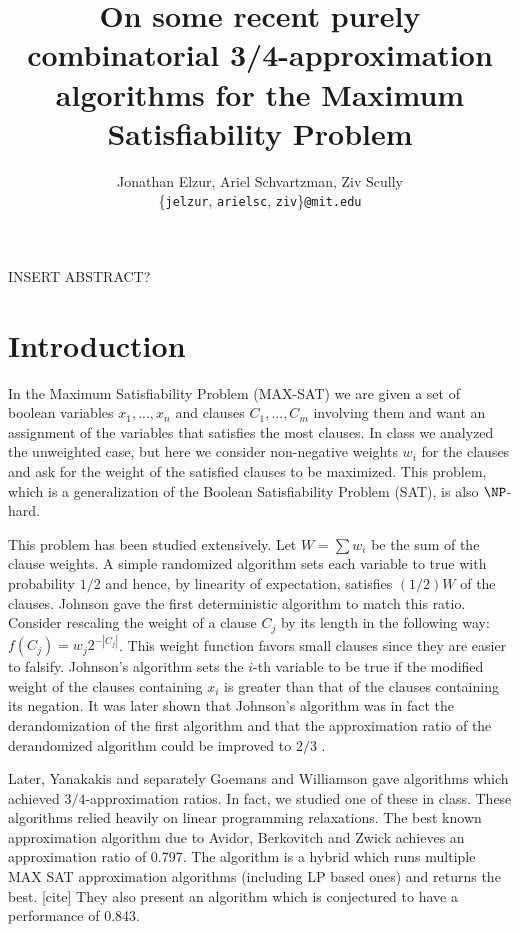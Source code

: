 \documentclass[11pt,letter]{article}
\numberwithin{theorem}{section}
\begin{document}


\title{On some recent purely combinatorial 3/4-approximation algorithms for the Maximum Satisfiability Problem}

\author{Jonathan Elzur, Ariel Schvartzman, Ziv Scully \\
  \{\texttt{jelzur}, \texttt{arielsc}, \texttt{ziv}\}\texttt{@mit.edu}}

\maketitle

INSERT ABSTRACT?

\section{Introduction}

In the Maximum Satisfiability Problem (MAX-SAT) we are given a set of boolean variables $x_1, ..., x_n$
and clauses $C_1,...,C_m$ involving them and want an assignment of the variables that satisfies the most clauses.
In class we analyzed the unweighted case, but here we consider non-negative weights $w_i$ for the clauses
and ask for the weight of the satisfied clauses to be maximized. This problem, which is a generalization of the
Boolean Satisfiability Problem (SAT), is also $\NP$-hard.

This problem has been studied extensively. Let $W = \sum w_i$ be the sum of the clause weights.
A simple randomized algorithm sets each variable to true with probability $1/2$ and hence,
by linearity of expectation, satisfies $(1/2)W$ of the clauses. Johnson \cite{Johnson1974256}
gave the first deterministic algorithm to match this ratio. Consider rescaling the weight of a clause $C_j$
by its length in the following way: $f(C_j) = w_j 2^{-|C_j|}$. This weight function favors small clauses
since they are easier to falsify. Johnson's algorithm sets the $i$-th variable to be true
if the modified weight of the clauses containing $x_i$ is greater than that of the clauses containing its negation.
It was later shown that Johnson's algorithm was in fact the derandomization of the first algorithm and that the
approximation ratio of the derandomized algorithm could be improved to $2/3$ \cite{Chen1999622}.

Later, Yanakakis \cite{Yannakakis1994475} and separately Goemans and Williamson \cite{Goemans94new3/4-approximation}
gave algorithms which achieved $3/4$-approximation ratios. In fact, we studied one of these in class.
These algorithms relied heavily on linear programming relaxations. The best known approximation algorithm due to Avidor, Berkovitch
and Zwick achieves an approximation ratio of 0.797. The algorithm is a hybrid which runs multiple MAX SAT approximation algorithms
(including LP based ones) and returns the best. [cite] They also present an algorithm which is conjectured to have a performance of 0.843. 
\end{document}
